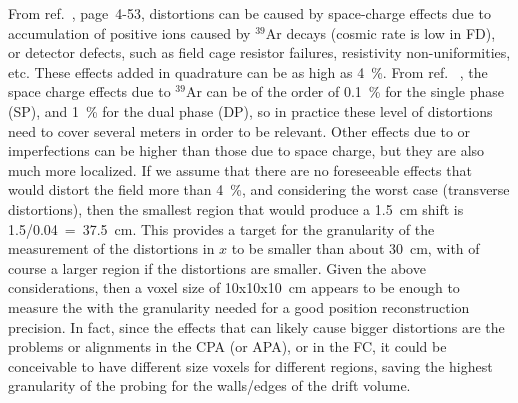 From ref.~\cite{idr-vol-1}, page~4-53, \efield distortions can be caused by space-charge effects due to accumulation of positive ions caused by $^{39}$Ar decays (cosmic rate is low in FD), or detector defects, such as field cage resistor failures, resistivity non-uniformities, etc. These effects added in quadrature can be as high as \num{4}~\%. From ref. ~\cite{mooney2018}, the space charge effects due to $^{39}$Ar can be of the order of \num{0.1}~\% for the single phase (SP), and \num{1}~\% for the dual phase (DP), so in practice these level of 
distortions need to cover several meters in order to be relevant.
Other effects due to  or  imperfections can be higher than those due to space charge, but they are also much more localized. If we assume that there are no foreseeable effects that would distort the field more than \num{4}~\%, and considering the worst case (transverse distortions), then the smallest region that would produce a \num{1.5}~cm  shift is \num{1.5}/\num{0.04}~=~\num{37.5}~cm. This provides a target for the granularity of the measurement of the \efield distortions in $x$ to be smaller than about \num{30}~cm, with of course a larger region if the distortions are smaller. Given the above considerations, then a voxel size of \num{10}x\num{10}x\num{10}~cm appears to be enough to measure the \efield with the granularity needed for a good position reconstruction precision. In fact, since the effects that can likely cause bigger \efield distortions are the problems or alignments in the CPA (or APA), or in the FC, it could be conceivable to have different size voxels for different regions, saving the highest granularity of the probing for the walls/edges of the drift volume.

\begin{comment}
\begin{dunetable}
[Calibration Requirements]
{p{0.5\textwidth}p{0.15\textwidth}p{0.15\textwidth}}
{tab:calibreq}
{Calibration Specifications and Goals}   
Requirement & Specification & Goal \\ \toprowrule
\efield measurement precision & < 1\% & ALARA \\ \colhline
\efield measurement coverage & > 75\% & AHARA \\ \colhline
\efield measurement granularity & < 30x30x30 cm & ALARA \\ \colhline
\end{dunetable}
\end{comment}

